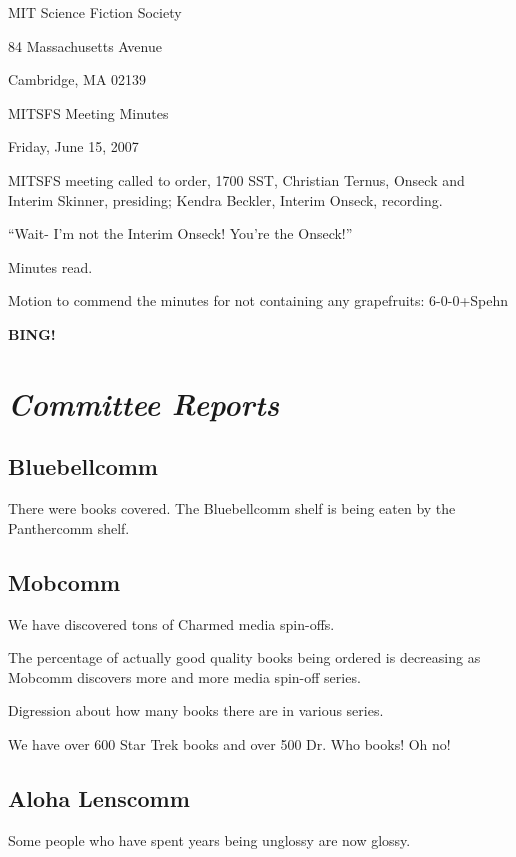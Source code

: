 \documentclass[10pt]{article}
\newcommand{\bing}{{\bf BING!} }
\newcommand{\goto}[1]{\bing \vskip 12pt \section*{{\em{#1}}}}
\begin{document}
\begin{center}

MIT Science Fiction Society

84 Massachusetts Avenue

Cambridge, MA 02139

\vspace{12pt}

MITSFS Meeting Minutes

Friday, June 15, 2007

\end{center}

\vspace{18pt}

\setlength{\parskip}{6pt}

\noindent
MITSFS meeting called to order, 1700 SST,
Christian Ternus, Onseck and Interim Skinner, presiding; Kendra Beckler, Interim Onseck, recording.  

``Wait- I'm not the Interim Onseck!  You're the Onseck!''

Minutes read.

Motion to commend the minutes for not containing any grapefruits: 6-0-0+Spehn

\goto{Committee Reports}

\subsection*{Bluebellcomm}

There were books covered.  The Bluebellcomm shelf is being eaten by the Panthercomm shelf.

\subsection*{Mobcomm}

We have discovered tons of Charmed media spin-offs.  

The percentage of actually good quality books being ordered is decreasing as Mobcomm discovers more and more media spin-off series.

Digression about how many books there are in various series.

We have over 600 Star Trek books and over 500 Dr. Who books!  Oh no!

\subsection*{Aloha Lenscomm}

Some people who have spent years being unglossy are now glossy.
\end{document}
